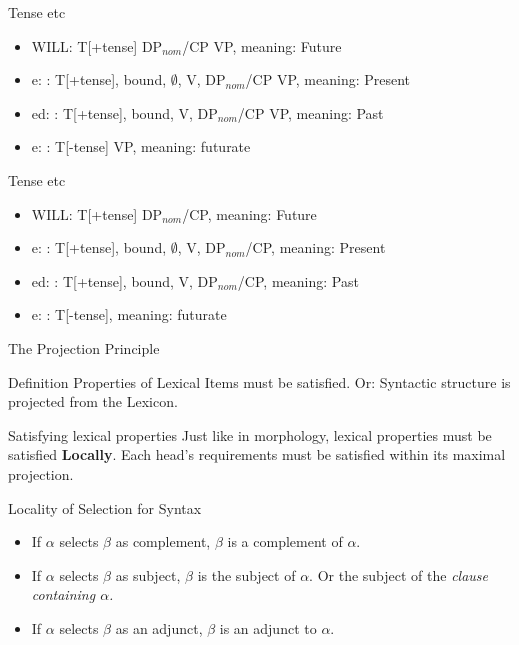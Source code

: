 \begin{frame}
  {Tense etc}
  \begin{itemize}
  \item WILL: T[+tense]  DP$_{nom}$/CP VP, meaning: Future
  \item e: : T[+tense], bound, $\emptyset$, V,  DP$_{nom}$/CP VP, meaning: Present
\item ed: : T[+tense], bound, V,  DP$_{nom}$/CP VP, meaning: Past  
\item e: : T[-tense] VP, meaning: futurate
\end{itemize}


\end{frame}
\begin{frame}
  {Tense etc}
  \begin{itemize}
  \item WILL: T[+tense]  DP$_{nom}$/CP, meaning: Future
  \item e: : T[+tense], bound, $\emptyset$, V,  DP$_{nom}$/CP, meaning: Present
\item ed: : T[+tense], bound, V,  DP$_{nom}$/CP, meaning: Past  
\item e: : T[-tense], meaning: futurate
\end{itemize}
\end{frame}


\begin{frame}
  {The Projection Principle}

\begin{block}
{Definition}
Properties of Lexical Items must be satisfied.  Or:  Syntactic structure is projected from the Lexicon.
\end{block}

\end{frame}

\begin{frame}
  {Satisfying lexical properties}
Just like in morphology, lexical properties must be satisfied \textbf{Locally}.  Each head's requirements must be satisfied within its maximal projection. 
\end{frame}
\begin{frame}
  \begin{block}
    {Locality of Selection for Syntax}
    \begin{itemize}
    \item If $\alpha$ selects $\beta$ as complement, $\beta$ is a complement of $\alpha$.
    \item If $\alpha$ selects $\beta$ as subject, $\beta$ is the subject of $\alpha$. Or the subject of the \textit{clause containing $\alpha$.}
    \item If $\alpha$ selects $\beta$ as an adjunct, $\beta$ is an adjunct to $\alpha$.
    \end{itemize}
  \end{block}
\end{frame}

